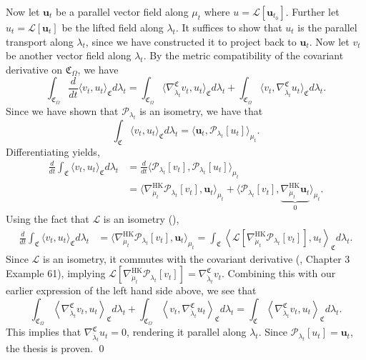 \documentclass[11pt]{article}
\begin{document}
Now let $\mathbf{u}_t$ be a parallel vector field along $\mu_t$  where $u = \mathcal{L}[\mathbf{u}_{t_0}]$. Further let $u_t = \mathcal{L}[\mathbf{u}_t]$ be the lifted field along $\lambda_t$. It suffices to show that $u_t$ is the parallel transport along $\lambda_t$, since we have constructed it to project back to $\mathbf{u}_t$. Now let $v_t$ be another vector field along $\lambda_t$. By the metric compatibility of the covariant derivative on $\mathfrak{C}_\Omega$, we have
\[\int_{\mathfrak{C}_\Omega}\frac{d}{dt} \langle v_t, u_t\rangle_{\mathfrak{C}} d\lambda_t = \int_{\mathfrak{C}_\Omega}\langle \nabla^\mathfrak{C}_{\dot \lambda_t} v_t,  u_t\rangle_{\mathfrak{C}} d\lambda_t + \int_{\mathfrak{C}_\Omega} \langle v_t, \nabla^\mathfrak{C}_{\dot \lambda_t}u_t\rangle_{\mathfrak{C}} d\lambda_t.\]
Since we have shown that $\mathcal{P}_{\lambda_t}$ is an isometry, we have that 
\[\int_{\mathfrak{C}}\langle v_t, u_t \rangle_\mathfrak{C} d\lambda_t  = \langle \mathbf{u}_t, \mathcal{P}_{\lambda_t}[u_t] \rangle_{\mu_t}.\]
Differentiating yields,
\begin{align*}
\frac{d}{dt}\int_{\mathfrak{C}}\langle v_t, u_t \rangle_\mathfrak{C} d\lambda_t  &= \frac{d}{dt}\langle \mathcal{P}_{\lambda_t}[v_t], \mathcal{P}_{\lambda_t}[u_t] \rangle_{\mu_t} \\
&= \langle \nabla_{\dot \mu_t}^{\text{HK}}\mathcal{P}_{\lambda_t}[v_t], \mathbf{u}_t \rangle_{\mu_t} + \langle \mathcal{P}_{\lambda_t}[v_t], \underbrace{\nabla_{\dot \mu_t}^{\text{HK}}\mathbf{u}_t}_{0} \rangle_{\mu_t}.
\end{align*}
Using the fact that $\mathcal{L}$ is an isometry (),
\begin{align*}
\frac{d}{dt}\int_{\mathfrak{C}}\langle v_t, u_t \rangle_\mathfrak{C} d\lambda_t  &= \langle \nabla_{\dot \mu_t}^{\text{HK}}\mathcal{P}_{\lambda_t}[v_t], \mathbf{u}_t \rangle_{\mu_t} = \int_{\mathfrak{C}}\left\langle \mathcal{L}[\nabla_{\dot \mu_t}^{\text{HK}}\mathcal{P}_{\lambda_t}[v_t]], u_t \right\rangle_{\mathfrak{C}} d\lambda_t.
\end{align*}
Since $\mathcal{L}$ is an isometry, it commutes with the covariant derivative (\citet{o1983semi}, Chapter 3 Example 61), implying $\mathcal{L}[\nabla_{\dot \mu_t}^{\text{HK}}\mathcal{P}_{\lambda_t}[v_t]] = \nabla_{\dot\lambda_t}^{\mathfrak{C}}v_t$. Combining this with our earlier expression of the left hand side above, we see that 
\[\int_{\mathfrak{C}_\Omega}\left\langle \nabla^\mathfrak{C}_{\dot \lambda_t} v_t,  u_t\right\rangle_{\mathfrak{C}} d\lambda_t + \int_{\mathfrak{C}_\Omega} \left\langle v_t, \nabla^\mathfrak{C}_{\dot \lambda_t}u_t\right\rangle_{\mathfrak{C}} d\lambda_t = \int_{\mathfrak{C}}\left\langle \nabla_{\dot\lambda_t}^{\mathfrak{C}}v_t, u_t \right\rangle_{\mathfrak{C}} d\lambda_t.\]
This implies that $\nabla^\mathfrak{C}_{\dot \lambda_t}u_t = 0$, rendering it parallel along $\lambda_t$. Since $\mathcal{P}_{\lambda_t}[u_t] = \mathbf{u}_t$, the thesis is proven. \qed{}
\\
\end{document}
